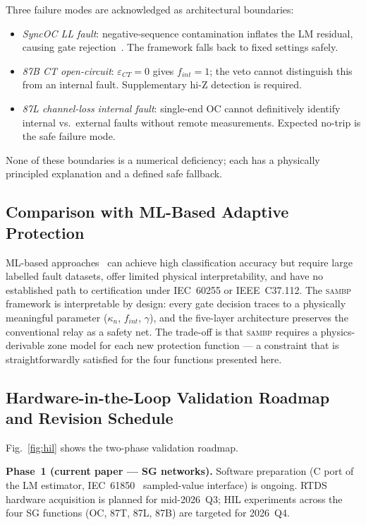 \documentclass[journal,twoside,10pt]{IEEEtran}
\begin{document}
Three failure modes are acknowledged as architectural boundaries:
\begin{itemize}
  \item \textit{SyncOC LL fault}: negative-sequence contamination inflates
        the LM residual, causing gate rejection~\cite{EluvathingalPaperB}.
        The framework falls back to fixed settings safely.
  \item \textit{87B CT open-circuit}: $\varepsilon_{CT} = 0$ gives
        $f_{int} = 1$; the veto cannot distinguish this from an internal
        fault. Supplementary hi-Z detection is required.
  \item \textit{87L channel-loss internal fault}: single-end OC cannot
        definitively identify internal vs.\ external faults without
        remote measurements. Expected no-trip is the safe failure mode.
\end{itemize}
None of these boundaries is a numerical deficiency; each has a physically
principled explanation and a defined safe fallback.

\subsection{Comparison with ML-Based Adaptive Protection}
\label{sec:disc:ml}

ML-based approaches~\cite{Sheikhzadeh2022,Gao2023} can achieve high
classification accuracy but require large labelled fault datasets,
offer limited physical interpretability, and have no established
path to certification under IEC~60255 or IEEE~C37.112.
The \textsc{sambp} framework is interpretable by design: every gate
decision traces to a physically meaningful parameter ($\kappa_n$,
$f_{int}$, $\gamma$), and the five-layer architecture preserves the
conventional relay as a safety net.
The trade-off is that \textsc{sambp} requires a physics-derivable
zone model for each new protection function — a constraint that is
straightforwardly satisfied for the four functions presented here.

\subsection{Hardware-in-the-Loop Validation Roadmap and Revision Schedule}
\label{sec:disc:hil}

Fig.~\ref{fig:hil} shows the two-phase validation roadmap.

\textbf{Phase~1 (current paper — SG networks).}
Software preparation (C port of the LM estimator,
IEC~61850~\cite{IEC61850} sampled-value interface) is ongoing.
RTDS hardware acquisition is planned for mid-2026~Q3;
HIL experiments across the four SG functions (OC, 87T, 87L, 87B)
are targeted for 2026~Q4.
\end{document}
